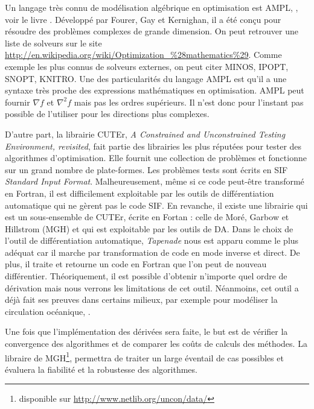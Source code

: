 



Un langage tr\`es connu de mod\'elisation alg\'ebrique en optimisation est AMPL, {,
 voir le livre \cite{761822}}. D\'evelopp\'e par Fourer, Gay et 
Kernighan, il a \'et\'e conçu pour r\'esoudre des probl\`emes complexes de grande dimension. {\co On peut retrouver une liste de solveurs
sur le site \url{http://en.wikipedia.org/wiki/Optimization_\%28mathematics\%29}. Comme exemple les plus connus 
de solveurs externes, on peut citer MINOS, IPOPT, 
SNOPT, KNITRO.} Une des particularit\'es du langage AMPL est qu'il a une syntaxe tr\`es proche des
expressions math\'ematiques en optimisation. 
AMPL peut fournir $\nabla f$ et $\nabla^2 f$ mais pas les ordres sup\'erieurs. Il n'est donc pour l'instant pas possible de l'utiliser 
pour les directions plus complexes.




D'autre part, la librairie CUTEr, {\it A Constrained and Unconstrained Testing Environment, revisited},
fait partie des librairies les plus r\'eput\'ees pour tester des algorithmes d'optimisation.
 Elle fournit une collection de probl\`emes et fonctionne sur un grand nombre de plate-formes. 
Les probl\`emes tests sont \'ecrits en SIF  {\it Standard Input Format}.
Malheureusement, même si ce code peut-être transform\'e en Fortran, il est difficilement exploitable par les outils
de diff\'erentiation automatique qui ne g\`erent pas le code SIF.
En revanche, il existe une librairie qui est un sous-ensemble de CUTEr, \'ecrite en Fortan : celle de Mor\'e, Garbow et Hillstrom (MGH) \cite{355936} 
et qui est exploitable par les outils de DA.
 Dans le choix de l'outil de diff\'erentiation automatique, {\it Tapenade} nous est apparu comme le plus ad\'equat car il marche
par transformation de code en mode inverse et direct. De plus, il traite et retourne un code en Fortran que l'on peut de nouveau diff\'erentier.
 Th\'eoriquement, il est possible d'obtenir n'importe quel ordre de d\'erivation mais nous verrons les limitations de cet outil. N\'eanmoins, 
 cet outil a d\'ej\`a fait ses preuves dans certains milieux, {\co par exemple pour mod\'eliser la circulation oc\'eanique, \cite{diffautoopa}.}

Une fois que l'impl\'ementation des d\'eriv\'ees sera faite, le but est de v\'erifier la convergence des algorithmes
 et de comparer les coûts de calculs des m\'ethodes.
La libraire de MGH\footnote{disponible sur \url{http://www.netlib.org/uncon/data/}}, permettra de traiter un large \'eventail de cas possibles et \'evaluera la fiabilit\'e et la robustesse des algorithmes.




